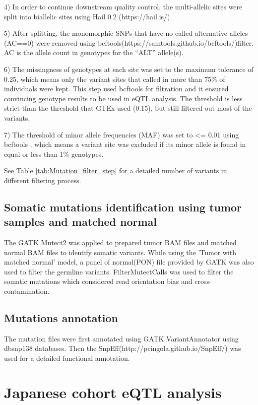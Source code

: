 4) In order to continue downstream quality control, the multi-allelic sites were split into biallelic sites using Hail 0.2 (https://hail.is/).

5) After splitting, the monomorphic SNPs that have no called alternative alleles (AC==0) were removed using bcftools(https://samtools.github.io/bcftools/)filter. AC is the allele count in genotypes for the “ALT” allele(s).

6) The missingness of genotypes at each site was set to the maximum tolerance of 0.25, which means only the variant sites that called in more than 75\%  of individuals were kept. This step used bcftools for filtration and it ensured convincing genotype results to be used in eQTL analysis. The threshold is less strict than the threshold that GTEx used (0.15), but still filtered out most of the variants.

7) The threshold of minor allele frequencies (MAF) was set to <= 0.01 using bcftools , which means a variant site was excluded if its minor allele is found in equal or less than 1\% genotypes. 

See Table \ref{tab:Mutation_filter_step} for a detailed number of variants in different filtering process.


\subsection{Somatic mutations identification using tumor samples and matched normal}
The GATK Mutect2 was applied to prepared tumor BAM files and matched normal BAM files to identify somatic variants. While using the 'Tumor with matched normal' model, a panel of normal(PON) file provided by GATK was also used to filter the germline variants. FilterMutectCalls was used to filter the somatic mutations which considered read orientation bias and cross-contamination.\\

\subsection{Mutations annotation}

The mutation files were first annotated using GATK VariantAnnotator using dbsnp138 databases. Then the SnpEff\cite{cingolani_program_2012}(http://pcingola.github.io/SnpEff/) was used for a detailed functional annotation.

\section{Japanese cohort eQTL analysis}


